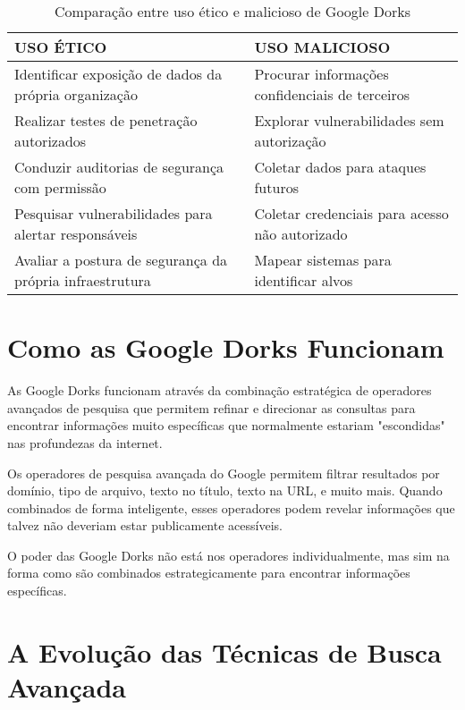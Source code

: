 \documentclass[12pt,a4paper]{book}
\begin{document}
\begin{table}[h]
\centering
\begin{tabular}{p{7cm}|p{7cm}}
\toprule
\textbf{\textcolor{verdeestabilidade}{USO ÉTICO}} & \textbf{\textcolor{vermelhoperigo}{USO MALICIOSO}} \\
\midrule
Identificar exposição de dados da própria organização & Procurar informações confidenciais de terceiros \\
Realizar testes de penetração autorizados & Explorar vulnerabilidades sem autorização \\
Conduzir auditorias de segurança com permissão & Coletar dados para ataques futuros \\
Pesquisar vulnerabilidades para alertar responsáveis & Coletar credenciais para acesso não autorizado \\
Avaliar a postura de segurança da própria infraestrutura & Mapear sistemas para identificar alvos \\
\bottomrule
\end{tabular}
\caption{Comparação entre uso ético e malicioso de Google Dorks}
\end{table}

\section{Como as Google Dorks Funcionam}

As Google Dorks funcionam através da combinação estratégica de operadores avançados de pesquisa que permitem refinar e direcionar as consultas para encontrar informações muito específicas que normalmente estariam "escondidas" nas profundezas da internet.

Os operadores de pesquisa avançada do Google permitem filtrar resultados por domínio, tipo de arquivo, texto no título, texto na URL, e muito mais. Quando combinados de forma inteligente, esses operadores podem revelar informações que talvez não deveriam estar publicamente acessíveis.

\begin{tipbox}
O poder das Google Dorks não está nos operadores individualmente, mas sim na forma como são combinados estrategicamente para encontrar informações específicas.
\end{tipbox}

\centering

\section{A Evolução das Técnicas de Busca Avançada}
\end{document}
